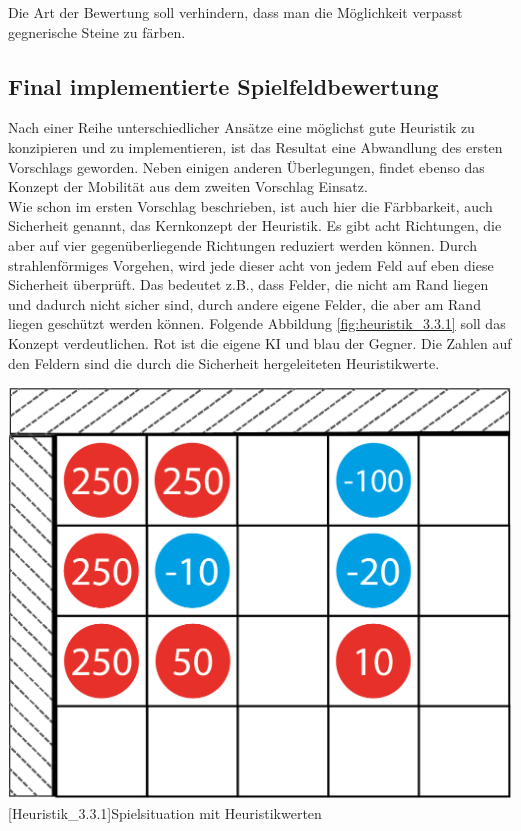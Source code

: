 \documentclass[12pt,a4paper,bibliography=totocnumbered,listof=totocnumbered]{scrartcl}
\begin{document}
    Die Art der Bewertung soll verhindern, dass man die Möglichkeit verpasst gegnerische Steine zu färben.

    \subsection{Final implementierte Spielfeldbewertung}
    \vspace{1em}

	Nach einer Reihe unterschiedlicher Ansätze eine möglichst gute Heuristik zu konzipieren und zu implementieren, ist das Resultat eine Abwandlung des ersten Vorschlags geworden. Neben einigen anderen Überlegungen, findet ebenso das Konzept der Mobilität aus dem zweiten Vorschlag Einsatz.\\
	Wie schon im ersten Vorschlag beschrieben, ist auch hier die \glqq Färbbarkeit\grqq, auch \glqq Sicherheit\grqq{}  genannt, das Kernkonzept der Heuristik. Es gibt acht Richtungen, die aber auf vier gegenüberliegende Richtungen reduziert werden können. Durch strahlenförmiges Vorgehen, wird jede dieser acht von jedem Feld auf eben diese \glqq Sicherheit\grqq{}  überprüft. Das bedeutet z.B., dass Felder, die nicht am Rand liegen und dadurch nicht sicher sind, durch andere eigene Felder, die aber am Rand liegen geschützt werden können. Folgende Abbildung  \ref{fig:heuristik_3.3.1} soll das Konzept verdeutlichen. Rot ist die eigene KI und blau der Gegner. Die Zahlen auf den Feldern sind die durch die \glqq Sicherheit\grqq{} hergeleiteten Heuristikwerte.
	
	\vspace{1em}
	\begin{minipage}{\linewidth}
		\centering
		\includegraphics[width=0.4\linewidth]{pics/Kapitel_3/Kapitel_3_pic8.png}
		[Heuristik_3.3.1]{Spielsituation mit Heuristikwerten\footnotemark }
		\label{fig:heuristik_3.3.1}
	\end{minipage}
	\vspace{1em}
\end{document}

